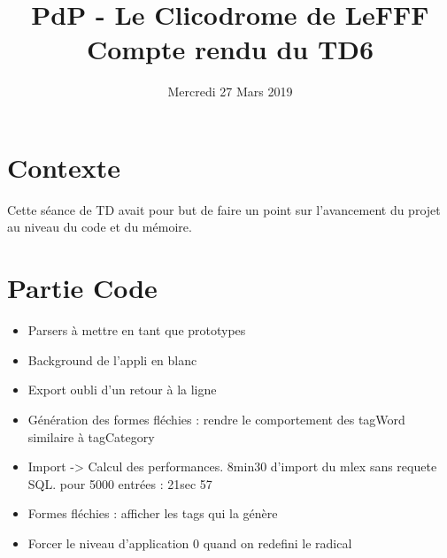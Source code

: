 \documentclass{article}
\title{PdP - Le Clicodrome de LeFFF \\ Compte rendu du TD6}
\author{}
\date{Mercredi 27 Mars 2019}
\begin{document}
\maketitle

\section{Contexte}
Cette séance de TD avait pour but de faire un point sur l'avancement du projet au niveau du code et du mémoire.

\section{Partie Code}
\begin{itemize}
    \item Parsers à mettre en tant que prototypes
    \item Background de l'appli en blanc
    \item Export oubli d'un retour à la ligne
    \item Génération des formes fléchies : rendre le comportement des tagWord similaire à tagCategory
    \item Import -> Calcul des performances. 8min30 d'import du mlex sans requete SQL. pour 5000 entrées : 21sec 57
    \item Formes fléchies : afficher les tags qui la génère
    \item Forcer le niveau d'application 0 quand on redefini le radical
\end{itemize}
\end{document}
